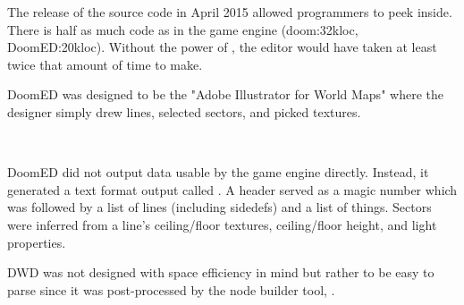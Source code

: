 The release of the source code in April 2015 allowed programmers to peek inside. There is half as much code as in the game engine (doom:32kloc, DoomED:20kloc). Without the power of \NeXTns, the editor would have taken at least twice that amount of time to make.



\par
DoomED was designed to be the "Adobe Illustrator for World Maps" where the designer simply drew lines, selected sectors, and picked textures.\\
\par
\vspace{10pt}
\\
\par
{}

DoomED did not output data usable by the game engine directly. Instead, it generated a text format output called . A header served as a magic number which was followed by a list of lines (including sidedefs) and a list of things. Sectors were inferred from a line's ceiling/floor textures, ceiling/floor height, and light properties.\\
\par
{}
\par
DWD was not designed with space efficiency in mind but rather to be easy to parse since it was post-processed by the node builder tool, .\\
\par
{}
\par

\pagebreak





